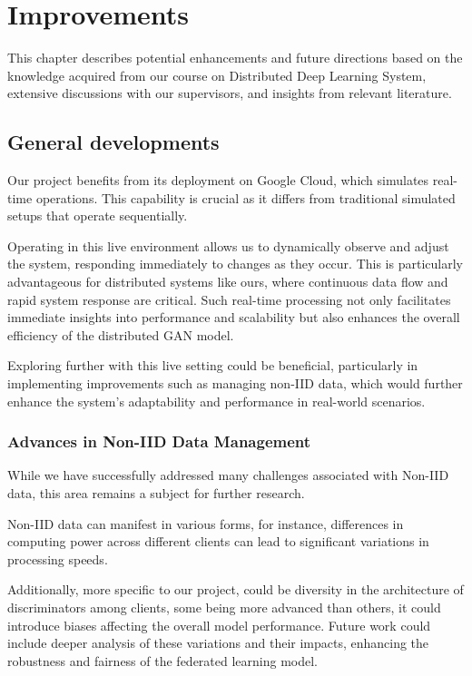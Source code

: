 \chapter{Improvements}
This chapter describes potential enhancements and future directions based on the knowledge acquired from our course on Distributed Deep Learning System, extensive discussions with our supervisors, and insights from relevant literature.


\section{General developments}
Our project benefits from its deployment on Google Cloud, which simulates real-time operations. This capability is crucial as it differs from traditional simulated setups that operate sequentially. 

Operating in this live environment allows us to dynamically observe and adjust the system, responding immediately to changes as they occur. This is particularly advantageous for distributed systems like ours, where continuous data flow and rapid system response are critical. Such real-time processing not only facilitates immediate insights into performance and scalability but also enhances the overall efficiency of the distributed GAN model.

Exploring further with this live setting could be beneficial, particularly in implementing improvements such as managing non-IID data, which would further enhance the system’s adaptability and performance in real-world scenarios.
 
\subsection{Advances in Non-IID Data Management}
While we have successfully addressed many challenges associated with Non-IID data, this area remains a subject for further research. 

Non-IID data can manifest in various forms, for instance, differences in computing power across different clients can lead to significant variations in processing speeds.

Additionally, more specific to our project, could be diversity in the architecture of discriminators among clients, some being more advanced than others, it could introduce biases affecting the overall model performance. 
Future work could include deeper analysis of these variations and their impacts, enhancing the robustness and fairness of the federated learning model.


